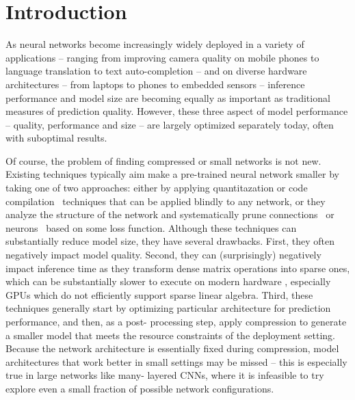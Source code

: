 
\section{Introduction}

As neural networks become increasingly widely deployed in a variety of
applications  -- ranging from improving camera quality on mobile phones
\cite{googleapple} to language translation \cite{languagetranslation} to text
auto-completion \cite{autocomplete} -- and on diverse hardware architectures
-- from laptops to phones to embedded sensors --  inference performance and
model size are becoming equally as important as  traditional measures of
prediction quality. However, these three aspect of model performance --
quality, performance and size -- are largely optimized separately today, often
with suboptimal results.

Of course, the problem of finding compressed or small networks is not new.
Existing techniques typically aim make a pre-trained neural network smaller
\cite{something1,something2} by taking one of two approaches:  either by
applying quantitazation \cite{quant} or code compilation~\cite{something}
techniques that can be applied blindly to any network, or they analyze the
structure of the network and systematically prune
connections~\cite{han2015deepcompression,brain-damage} or neurons~\cite{XXX}
based on some loss function.  Although these techniques can substantially
reduce model size, they have several drawbacks.  First, they often negatively
impact model quality.  Second, they can (surprisingly) negatively impact
inference time as they transform dense matrix operations into sparse ones,
which can be substantially slower to execute on modern hardware
\cite{something}, especially GPUs which do not efficiently support sparse
linear algebra.  Third, these techniques generally start by optimizing
particular architecture for prediction performance, and then, as a post-
processing step, apply compression  to generate a smaller model that meets the
resource constraints of the   deployment setting.  Because the network
architecture is essentially fixed during compression,   model architectures
that work better in small settings may be missed -- this is especially true in
large networks like many- layered CNNs,  where it is infeasible to try explore
even a small fraction of possible network configurations.


